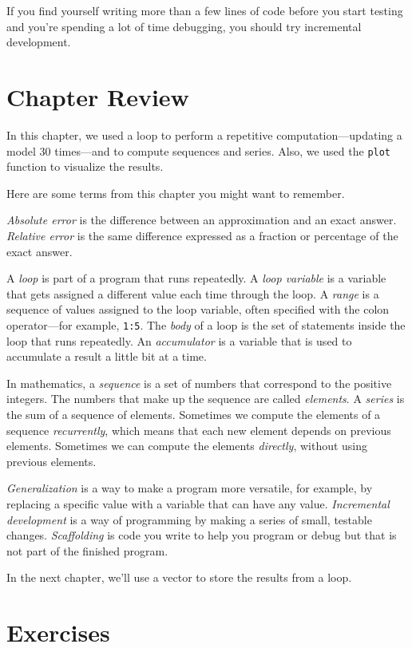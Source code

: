 If you find yourself writing more than a few lines of code before
you start testing and you're spending a lot of time debugging,
you should try incremental development.




\section{Chapter Review}

In this chapter, we used a loop to perform a repetitive computation---updating a model 30 times---and to compute sequences and series.  Also,  we used the \lstinline{plot} function to visualize the results.

Here are some terms from this chapter you might want to remember.

\emph{Absolute error} is the difference between an approximation and
an exact answer. \emph{Relative error} is the same difference expressed as a fraction or percentage of the exact answer.

A \emph{loop} is part of a program that runs repeatedly.
A \emph{loop variable} is a variable that gets assigned a different value each time through the loop.
A \emph{range} is a sequence of values assigned to the loop variable, often
specified with the colon operator---for example, \lstinline{1:5}.
The \emph{body} of a loop is the set of statements inside the loop that runs repeatedly.
An \emph{accumulator} is a variable that is used to accumulate a result a little bit at a time.

In mathematics, a \emph{sequence} is a set of numbers that correspond
to the positive integers.
The numbers that make up the sequence are called \mbox{\emph{elements}}.
A \emph{series} is the sum of a sequence of elements.
Sometimes we compute the elements of a sequence \emph{recurrently}, which means that each new element depends on previous elements.  Sometimes we can compute the elements \emph{directly}, without using previous elements.

\emph{Generalization} is a way to make a program more versatile, for example, by replacing a specific value with a variable that can have any value.
\emph{Incremental development} is a way of programming by making a series of small, testable changes.
\emph{Scaffolding} is code you write to help you program or debug but
that is not part of the finished program.

In the next chapter, we'll use a vector to store the results from a loop.


\section{Exercises}

